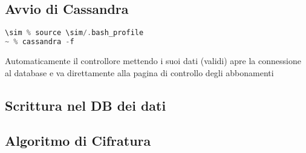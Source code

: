 \subsection{Avvio di Cassandra}
\begin{lstlisting}[language=C]
\sim % source \sim/.bash_profile
~ % cassandra -f 
\end{lstlisting}
Automaticamente il controllore mettendo i suoi dati (validi) apre la connessione al database e va direttamente alla pagina di controllo degli abbonamenti
\subsection{Scrittura nel DB dei dati}
\subsection{Algoritmo di Cifratura}